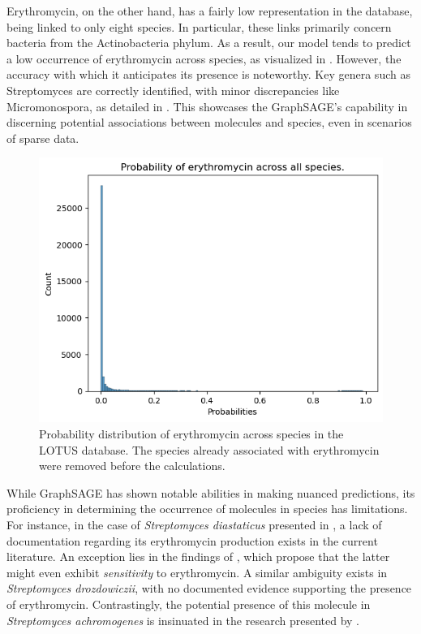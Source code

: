 \documentclass[
11pt, %
oneside, %
english, %
singlespacing, %
headsepline, %
chapterinoneline, %
]{MastersDoctoralThesis} %
\begin{document}
Erythromycin, on the other hand, has a fairly low representation in the database, being linked to only eight species. In particular, these links primarily concern bacteria from the Actinobacteria phylum. As a result, our model tends to predict a low occurrence of erythromycin across species, as visualized in . However, the accuracy with which it anticipates its presence is noteworthy. Key genera such as Streptomyces are correctly identified, with minor discrepancies like Micromonospora, as detailed in . This showcases the GraphSAGE's capability in discerning potential associations between molecules and species, even in scenarios of sparse data. 

\begin{figure}[h]
	\centering
	\includegraphics[scale=0.7]{figure/erythromycin}
	\caption{Probability distribution of erythromycin across species in the LOTUS database. The species already associated with erythromycin were removed before the calculations.}
	\label{fig: hist erythromycin}
\end{figure}

While GraphSAGE has shown notable abilities in making nuanced predictions, its proficiency in determining the occurrence of molecules in species has limitations. For instance, in the case of \textit{Streptomyces diastaticus} presented in , a lack of documentation regarding its erythromycin production exists in the current literature. An exception lies in the findings of \cite{graham23SRibosomalRibonucleic1979}, which propose that the latter might even exhibit \textit{sensitivity} to erythromycin. A similar ambiguity exists in \textit{Streptomyces drozdowiczii}, with no documented evidence supporting the presence of erythromycin. Contrastingly, the potential presence of this molecule in \textit{Streptomyces achromogenes} is insinuated in the research presented by \cite{moosawiComputationalPredictionProperties2010}.
\end{document}
